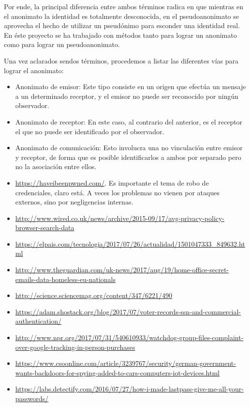 Por ende, la principal diferencia entre ambos términos radica en que mientras en el anonimato la identidad es totalmente desconocida, en el pseudoanonimato se aprovecha el hecho de utilizar un pseudónimo para esconder una identidad real. 
En éste proyecto se ha trabajado con métodos tanto para lograr un anonimato como para lograr un pseudoanonimato.

Una vez aclarados sendos términos, procedemos a listar las diferentes vías para lograr el anonimato:

\begin{itemize}
	\item Anonimato de emisor: Este tipo consiste en un origen que efectúa un mensaje a un determinado receptor, y el emisor no puede ser reconocido por ningún observador.
	\item Anonimato de receptor: En este caso, al contrario del anterior, es el receptor el que no puede ser identificado por el observador.
	\item Anonimato de comunicación: Esto involucra una no vinculación entre emisor y receptor, de forma que es posible identificarlos a ambos por separado pero no la asociación entre ellos.

\end{itemize}

 \label{sec:historia}
\begin{itemize}
  \item \url{https://haveibeenpwned.com/}. Es importante el tema de
    robo de credenciales, claro está. A veces los problemas no vienen
    por ataques externos, sino por negligencias internas.
    \item \url{http://www.wired.co.uk/news/archive/2015-09/17/avg-privacy-policy-browser-search-data}
    \item \url{https://elpais.com/tecnologia/2017/07/26/actualidad/1501047333_849632.html}
    \item \url{http://www.theguardian.com/uk-news/2017/aug/19/home-office-secret-emails-data-homeless-eu-nationals}
    \item \url{http://science.sciencemag.org/content/347/6221/490}
    \item \url{https://adam.shostack.org/blog/2017/07/voter-records-ssn-and-commercial-authentication/}
    \item \url{http://www.npr.org/2017/07/31/540610933/watchdog-group-files-complaint-over-google-tracking-in-person-purchases}
    \item \url{https://www.csoonline.com/article/3239767/security/german-government-wants-backdoors-for-spying-added-to-cars-computers-iot-devices.html}
    \item \url{https://labs.detectify.com/2016/07/27/how-i-made-lastpass-give-me-all-your-passwords/}      
  \end{itemize}

